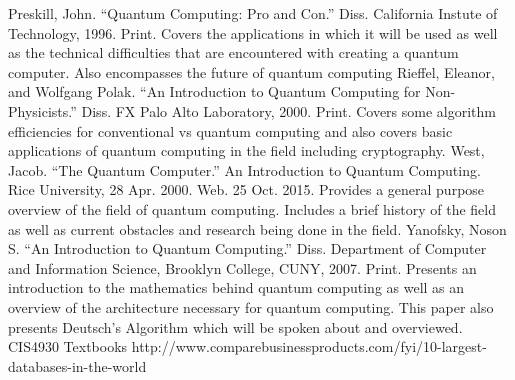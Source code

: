 \documentclass[12pt]{article}
\begin{document}
\begin{thebibliography}{1}
Preskill, John. ``Quantum Computing: Pro and Con.'' Diss. California Instute of Technology, 1996. Print. Covers the applications in which it will be used as well as the technical difficulties that are encountered with creating a quantum computer. Also encompasses the future of quantum computing
Rieffel, Eleanor, and Wolfgang Polak. ``An Introduction to Quantum Computing for Non-Physicists.'' Diss. FX Palo Alto Laboratory, 2000. Print. Covers some algorithm efficiencies for conventional vs quantum computing and also covers basic applications of quantum computing in the field including cryptography.
West, Jacob. ``The Quantum Computer.'' An Introduction to Quantum Computing. Rice University, 28 Apr. 2000. Web. 25 Oct. 2015. Provides a general purpose overview of the field of quantum computing. Includes a brief history of the field as well as current obstacles and research being done in the field.
Yanofsky, Noson S. ``An Introduction to Quantum Computing.'' Diss. Department of Computer and Information Science, Brooklyn College, CUNY, 2007. Print. Presents an introduction to the mathematics behind quantum computing as well as an overview of the architecture necessary for quantum computing. This paper also presents Deutsch's Algorithm which will be spoken about and overviewed.
CIS4930 Textbooks
http://www.comparebusinessproducts.com/fyi/10-largest-databases-in-the-world
\end{thebibliography}

\clearpage
\end{document}
